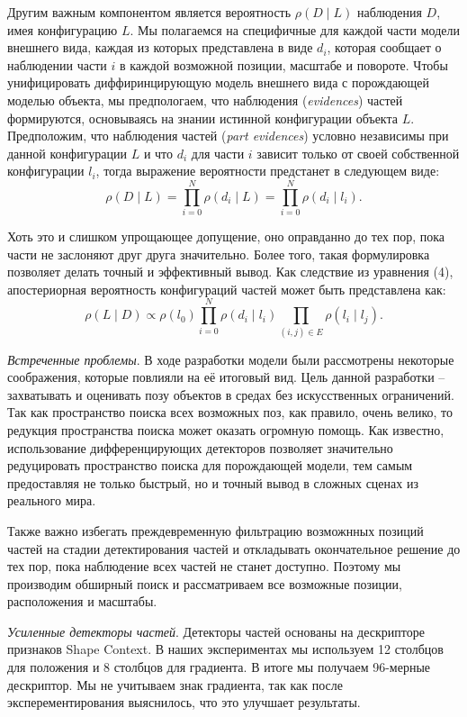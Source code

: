 Другим важным компонентом является вероятность \(\rho(D{\mid}L)\) наблюдения \(D\), имея конфигурацию \(L\). Мы полагаемся на специфичные для каждой части модели внешнего вида, каждая из которых представлена в виде \(d_i\), которая сообщает о наблюдении части \(i\) в каждой возможной позиции, масштабе и повороте. Чтобы унифицировать диффиринцирующую модель внешнего вида с порождающей моделью объекта, мы предпологаем, что наблюдения (\emph{evidences}) частей формируются, основываясь на знании истинной конфигурации объекта \(L\). Предположим, что наблюдения частей (\emph{part evidences}) условно независимы при данной конфигурации \(L\) и что \(d_i\) для части \(i\) зависит только от своей собственной конфигурации \(l_i\), тогда выражение вероятности предстанет в следующем виде:
\begin{equation}
  \rho(D{\mid}L) = \prod_{i = 0}^N\rho(d_i{\mid}L) = \prod_{i = 0}^N\rho(d_i{\mid}l_i).
\end{equation}

Хоть это и слишком упрощающее допущение, оно оправданно до тех пор, пока части не заслоняют друг друга значительно. Более того, такая формулировка позволяет делать точный и эффективный вывод. Как следствие из уравнения (4), апостериорная вероятность конфигураций частей может быть представлена как:
\begin{equation}
  \rho(L{\mid}D) \propto \rho(l_0) \prod_{i = 0}^N\rho(d_i{\mid}l_i) \prod_{(i, j) \in E}\rho(l_i{\mid}l_j).
\end{equation}

\emph{Встреченные проблемы}. В ходе разработки модели были рассмотрены некоторые соображения, которые повлияли на её итоговый вид. Цель данной разработки -- захватывать и оценивать позу объектов в средах без искусственных ограничений. Так как пространство поиска всех возможных поз, как правило, очень велико, то редукция пространства поиска может оказать огромную помощь. Как известно, использование дифференцирующих детекторов позволяет значительно редуцировать пространство поиска для порождающей модели, тем самым предоставляя не только быстрый, но и точный вывод в сложных сценах из реального мира.

Также важно избегать преждевременную фильтрацию возможнных позиций частей на стадии детектирования частей и откладывать окончательное решение до тех пор, пока наблюдение всех частей не станет доступно. Поэтому мы производим обширный поиск и рассматриваем все возможные позиции, расположения и масштабы.

\emph{Усиленные детекторы частей}. Детекторы частей основаны на дескрипторе признаков Shape Context. В наших экспериментах мы используем 12 столбцов для положения и 8 столбцов для градиента. В итоге мы получаем 96-мерные дескриптор. Мы не учитываем знак градиента, так как после эксперементирования выяснилось, что это улучшает результаты.

